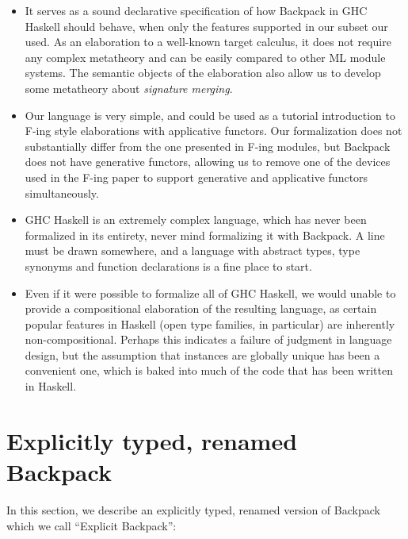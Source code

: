 \documentclass{article}
\begin{document}
\begin{itemize}

\item It serves as a sound declarative specification of how Backpack in
    GHC Haskell should behave, when only the features supported in our
    subset our used.  As an elaboration to a well-known target calculus,
    it does not require any complex metatheory and can be easily compared
    to other ML module systems.  The semantic objects of the elaboration
    also allow us to develop some metatheory about \emph{signature merging}.

\item Our language is very simple, and could be used as a tutorial introduction
    to F-ing style elaborations with applicative functors.
    Our formalization does not substantially differ from the one
    presented in F-ing modules, but Backpack does not have generative
    functors, allowing us to remove one of the devices used in the
    F-ing paper to support generative and applicative functors simultaneously.

\item GHC Haskell is an extremely complex language, which has never
    been formalized in its entirety, never mind formalizing it with
    Backpack.  A line must be drawn somewhere, and a language with
    abstract types, type synonyms and function declarations is a fine
    place to start.

\item Even if it were possible to formalize all of GHC Haskell, we would
    unable to provide a compositional elaboration of the resulting language,
    as certain popular features in Haskell (open type families, in particular)
    are inherently non-compositional.  Perhaps this indicates a failure
    of judgment in language design, but the assumption that instances
    are globally unique has been a convenient one, which is baked
    into much of the code that has been written in Haskell.

\end{itemize}

\section{Explicitly typed, renamed Backpack}

In this section, we describe an explicitly typed,
renamed version of Backpack which we call ``Explicit Backpack'':
\end{document}
